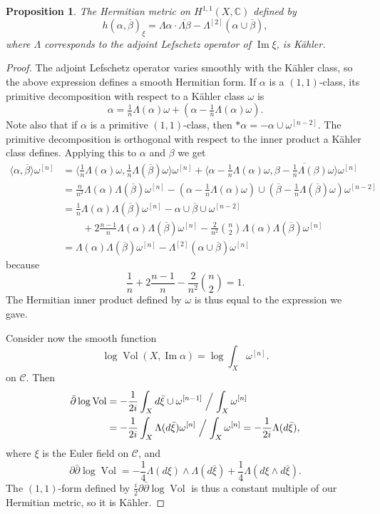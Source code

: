 \documentclass[10pt,a4paper]{article}
\newtheorem{prop}[theo]{Proposition}
\newtheorem*{proof}{Proof}
\newcommand{\kk}[1]{\mathbb{#1}}
\newcommand{\cc}[1]{\mathcal{#1}}
\def\^#1{^{[#1]}}
\def\ov#1{\overline{#1}}
\DeclareMathOperator{\im}{Im}
\DeclareMathOperator{\Vol}{Vol}
\begin{document}
\begin{prop}
The Hermitian metric on $H^{1,1}(X,\kk C)$ defined by
\[
h(\alpha, \ov\beta)_{\xi}
= \Lambda \alpha \cdot \ov{\Lambda \beta} - \Lambda\^2 (\alpha \cup \ov\beta),
\]
where $\Lambda$ corresponds to the adjoint Lefschetz operator of $\im \xi$, is K\"ahler.
\end{prop}

\begin{proof}
The adjoint Lefschetz operator varies smoothly with the K\"ahler class, so the above expression defines a smooth Hermitian form. If $\alpha$ is a $(1,1)$-class, its primitive decomposition with respect to a K\"ahler class $\omega$ is
\[
\alpha
= \tfrac 1n \Lambda(\alpha) \omega
+ (\alpha - \tfrac 1n \Lambda(\alpha) \omega).
\]
Note also that if $\alpha$ is a primitive $(1,1)$-class, then $*\alpha = - \alpha \cup \omega\^{n-2}$.
The primitive decomposition is orthogonal with respect to the inner product a K\"ahler class defines. Applying this to $\alpha$ and $\beta$ we get
\begin{align*}
\langle \alpha, \ov \beta \rangle \omega\^n
&=
\langle \tfrac 1n \Lambda(\alpha) \omega,
\tfrac 1n \Lambda(\ov\beta) \omega \rangle
\omega\^n
+ \langle
\alpha - \tfrac 1n \Lambda(\alpha) \omega,
\ov{\beta - \tfrac 1n \Lambda(\beta) \omega}
\rangle \omega\^n
\\
&=
\frac{n}{n^2}
\Lambda(\alpha) \Lambda(\ov\beta)
 \omega\^n
- (\alpha - \tfrac 1n \Lambda(\alpha) \omega)
\cup (\ov\beta - \tfrac 1n \Lambda(\ov\beta)\omega) \omega\^{n-2}
\\
&=
\frac{1}{n}
\Lambda(\alpha) \Lambda(\ov\beta)
\omega\^n
- \alpha \cup \ov \beta \cup \omega\^{n-2}
\\
&\qquad{}
+ 2\frac{n-1}{n} \Lambda(\alpha) \Lambda(\ov\beta) \omega\^n
- \frac{2}{n^2} \binom{n}{2} \Lambda(\alpha) \Lambda(\ov\beta) \omega\^n
\\
&=
\Lambda(\alpha) \Lambda(\ov\beta) \omega\^n
- \Lambda\^2(\alpha \cup \ov\beta) \omega\^n
\end{align*}
because
\[
\frac 1n
+ 2 \frac{n-1}{n}
- \frac{2}{n^2} \binom{n}2
= 1.
\]
The Hermitian inner product defined by $\omega$ is thus equal to the expression we gave.

Consider now the smooth function
\[
\log \Vol(X, \im \alpha)
= \log \int_X \omega\^n.
\]
on $\cc C$. Then
\begin{align*}
\bar\partial \log\Vol
&= -\frac{1}{2i} \int_X d\bar\xi \cup \omega\^{n-1}
\Bigm/ \int_X \omega\^n
\\
&= -\frac{1}{2i} \int_X \Lambda(d\bar\xi) \omega\^n
\Bigm/ \int_X \omega\^n
= -\frac{1}{2i} \Lambda(d\bar\xi),
\end{align*}
where $\xi$ is the Euler field on $\cc C$, and
\[
\partial\bar\partial \log\Vol
= -\frac 14 \Lambda(d\xi) \wedge \Lambda(d\bar\xi)
+ \frac 14 \Lambda(d\xi \wedge d\bar\xi).
\]
The $(1,1)$-form defined by $\frac i2 \partial\bar\partial \log \Vol$ is thus a constant multiple of our Hermitian metric, so it is K\"ahler.
\end{proof}
\end{document}
